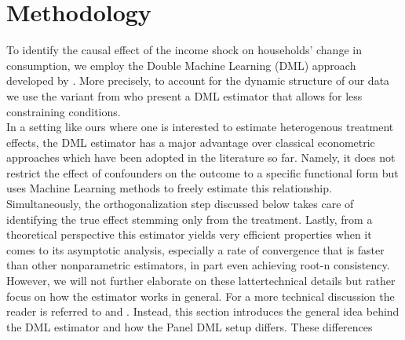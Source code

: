 \newpage
\section{Methodology}
To identify the causal effect of the income shock on households' change in consumption, we employ the Double Machine Learning (DML) approach developed by \cite{DML2017}. More precisely, to account for the dynamic structure of our data we use the variant from \cite{PanelDML} who present a DML estimator that allows for less constraining conditions. \\ 
In a setting like ours where one is interested to estimate heterogenous treatment effects, the DML estimator has a major advantage over classical econometric approaches which have been adopted in the literature so far. Namely, it does not restrict the effect of confounders on the outcome to a specific functional form but uses Machine Learning methods to freely estimate this relationship. Simultaneously, the orthogonalization step discussed below takes care of identifying the true effect stemming only from the treatment. Lastly, from a theoretical perspective this estimator yields very efficient properties when it comes to its asymptotic analysis, especially a rate of convergence that is faster than other nonparametric estimators, in part even achieving root-n consistency. However, we will not further elaborate on these lattertechnical details but rather focus on how the estimator works in general. For a more technical discussion the reader is referred to \cite{DML2017} and \cite{PanelDML}. Instead, this section introduces the general idea behind the DML estimator and how the Panel DML setup differs. These differences 

